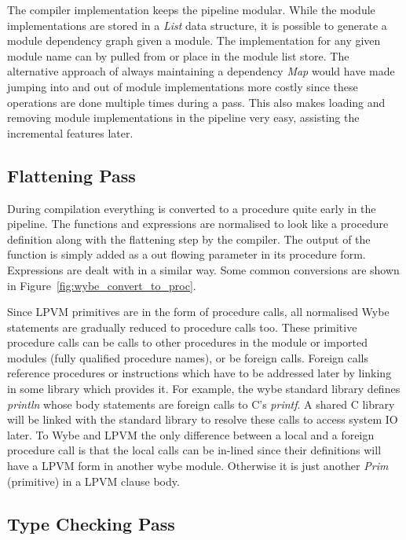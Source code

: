 The compiler implementation keeps the pipeline modular. While the module
implementations are stored in a \textit{List} data structure, it is possible to
generate a module dependency graph given a module. The implementation for any
given module name can by pulled from or place in the module list store. The
alternative approach of always maintaining a dependency \textit{Map} would have
made jumping into and out of module implementations more costly since these
operations are done multiple times during a pass. This also makes loading and
removing module implementations in the pipeline very easy, assisting the
incremental features later.



\subsection{Flattening Pass}

During compilation everything is converted to a procedure quite early
in the pipeline. The functions and expressions are normalised to look like a
procedure definition along with the flattening step by the compiler. The output
of the function is simply added as a out flowing parameter in its procedure
form. Expressions are dealt with in a similar way.  Some common conversions are
shown in Figure~\ref{fig:wybe_convert_to_proc}.

Since LPVM primitives are in the form of procedure calls, all normalised Wybe
statements are gradually reduced to procedure calls too. These primitive
procedure calls can be calls to other procedures in the module or imported
modules (fully qualified procedure names), or be foreign calls. Foreign calls
reference procedures or instructions which have to be addressed later by
linking in some library which provides it. For example, the wybe standard
library defines \textit{println} whose body statements are foreign calls to C's
\textit{printf}. A shared C library will be linked with the standard library to
resolve these calls to access system IO later. To Wybe and LPVM the only
difference between a local and a foreign procedure call is that the local calls
can be in-lined since their definitions will have a LPVM form in another wybe
module. Otherwise it is just another \textit{Prim} (primitive) in a LPVM clause
body.

\subsection{Type Checking Pass}

